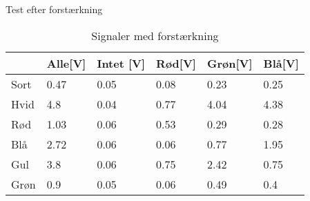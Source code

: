Test efter forstærkning
\begin{table}[H]
\centering
\caption{Signaler med forstærkning} \label{tab:farvemedforstaerker}
\begin{tabular}{l|lllll}
\hline\hline
     & Alle{[\si{V}]} & Intet {[\si{V}]} & Rød{[\si{V}]} & Grøn{[\si{V}]} & Blå{[\si{V}]} \\
     \hline
Sort & 0.47        & 0.05          & 0.08       & 0.23        & 0.25       \\
Hvid & 4.8         & 0.04          & 0.77       & 4.04        & 4.38       \\
Rød  & 1.03        & 0.06          & 0.53       & 0.29        & 0.28       \\
Blå  & 2.72        & 0.06          & 0.06       & 0.77        & 1.95       \\
Gul  & 3.8         & 0.06          & 0.75       & 2.42        & 0.75       \\
Grøn & 0.9         & 0.05          & 0.06       & 0.49        & 0.4 \\[1ex]
\hline
\end{tabular}
\end{table}

